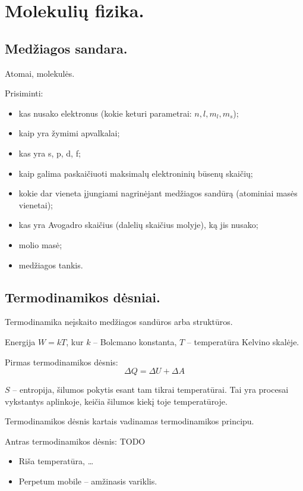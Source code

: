 \chapter{Molekulių fizika.}
\section{Medžiagos sandara.}
Atomai, molekulės.

Prisiminti:
\begin{itemize}
  \item kas nusako elektronus (kokie keturi parametrai: $n, l, m_{l},
    m_{s}$);
  \item kaip yra žymimi apvalkalai;
  \item kas yra s, p, d, f;
  \item kaip galima paskaičiuoti maksimalų elektroninių būsenų skaičių;
  \item kokie dar vieneta įjungiami nagrinėjant medžiagos sandūrą
    (atominiai masės vienetai);
  \item kas yra Avogadro skaičius (dalelių skaičius molyje), ką jis nusako;
  \item molio masė;
  \item medžiagos tankis.
\end{itemize}

\section{Termodinamikos dėsniai.}

Termodinamika neįskaito medžiagos sandūros arba struktūros.

Energija $W = kT$, kur $k$ – Bolcmano konstanta, $T$ – temperatūra
Kelvino skalėje.

Pirmas termodinamikos dėsnis:
\begin{equation*}
  \Delta Q = \Delta U + \Delta A
\end{equation*}

$S$ – entropija, šilumos pokytis esant tam tikrai temperatūrai. Tai yra
procesai vykstantys aplinkoje, keičia šilumos kiekį toje temperatūroje.

Termodinamikos dėsnis kartais vadinamas termodinamikos principu.

Antras termodinamikos dėsnis: TODO


\begin{itemize}
  \item Riša temperatūra, …
  \item Perpetum mobile – amžinasis variklis.
\end{itemize}

